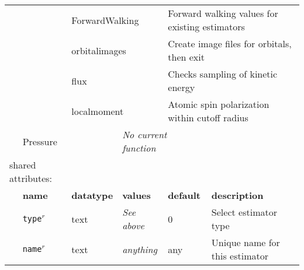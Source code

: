 \begin{table}[h]
\begin{center}
\begin{tabularx}{\textwidth}{l l l l l l }
\multicolumn{2}{l}{                } & \multicolumn{2}{l}{ForwardWalking    } & \multicolumn{2}{l}{Forward walking values for existing estimators}\\
\multicolumn{2}{l}{                } & \multicolumn{2}{l}{orbitalimages     } & \multicolumn{2}{l}{Create image files for orbitals, then exit}\\
\multicolumn{2}{l}{                } & \multicolumn{2}{l}{flux              } & \multicolumn{2}{l}{Checks sampling of kinetic energy}\\
\multicolumn{2}{l}{                } & \multicolumn{2}{l}{localmoment       } & \multicolumn{2}{l}{Atomic spin polarization within cutoff radius}\\
\dev{
\multicolumn{2}{l}{                } & \multicolumn{2}{l}{Pressure          } & \multicolumn{2}{l}{\textit{No current function}}\\
\multicolumn{2}{l}{shared attributes:} & \multicolumn{4}{l}{}\\
}
   &   \bfseries name     & \bfseries datatype & \bfseries values & \bfseries default   & \bfseries description \\
   &   \texttt{type}$^r$      &  text              & \textit{See above}        & 0                   & Select estimator type         \\
   &   \texttt{name}$^r$      &  text              & \textit{anything}         & any                 & Unique name for this estimator\\
\hline
\end{tabularx}
\end{center}
\end{table}
\FloatBarrier




